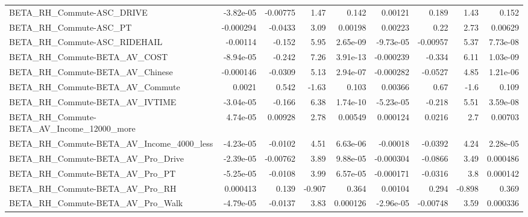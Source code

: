 \begin{tabular}{lrrrrrrrr}
BETA\_RH\_Commute-ASC\_DRIVE                          &   -3.82e-05 &     -0.00775 &      1.47 &    0.142 &    0.00121 &       0.189 &         1.43 &         0.152 \\
BETA\_RH\_Commute-ASC\_PT                             &   -0.000294 &      -0.0433 &      3.09 &  0.00198 &    0.00223 &        0.22 &         2.73 &       0.00629 \\
BETA\_RH\_Commute-ASC\_RIDEHAIL                       &    -0.00114 &       -0.152 &      5.95 & 2.65e-09 &  -9.73e-05 &    -0.00957 &         5.37 &      7.73e-08 \\
BETA\_RH\_Commute-BETA\_AV\_COST                       &   -8.94e-05 &       -0.242 &      7.26 & 3.91e-13 &  -0.000239 &      -0.334 &         6.11 &      1.03e-09 \\
BETA\_RH\_Commute-BETA\_AV\_Chinese                    &   -0.000146 &      -0.0309 &      5.13 & 2.94e-07 &  -0.000282 &     -0.0527 &         4.85 &      1.21e-06 \\
BETA\_RH\_Commute-BETA\_AV\_Commute                    &      0.0021 &        0.542 &     -1.63 &    0.103 &    0.00366 &        0.67 &         -1.6 &         0.109 \\
BETA\_RH\_Commute-BETA\_AV\_IVTIME                     &   -3.04e-05 &       -0.166 &      6.38 & 1.74e-10 &  -5.23e-05 &      -0.218 &         5.51 &      3.59e-08 \\
BETA\_RH\_Commute-BETA\_AV\_Income\_12000\_more          &    4.74e-05 &      0.00928 &      2.78 &  0.00549 &   0.000124 &      0.0216 &          2.7 &       0.00703 \\
BETA\_RH\_Commute-BETA\_AV\_Income\_4000\_less           &   -4.23e-05 &      -0.0102 &      4.51 & 6.63e-06 &   -0.00018 &     -0.0392 &         4.24 &      2.28e-05 \\
BETA\_RH\_Commute-BETA\_AV\_Pro\_Drive                  &   -2.39e-05 &     -0.00762 &      3.89 & 9.88e-05 &  -0.000304 &     -0.0866 &         3.49 &      0.000486 \\
BETA\_RH\_Commute-BETA\_AV\_Pro\_PT                     &   -5.25e-05 &      -0.0108 &      3.99 & 6.57e-05 &  -0.000171 &     -0.0316 &          3.8 &      0.000142 \\
BETA\_RH\_Commute-BETA\_AV\_Pro\_RH                     &    0.000413 &        0.139 &    -0.907 &    0.364 &    0.00104 &       0.294 &       -0.898 &         0.369 \\
BETA\_RH\_Commute-BETA\_AV\_Pro\_Walk                   &   -4.79e-05 &      -0.0137 &      3.83 & 0.000126 &  -2.96e-05 &    -0.00748 &         3.59 &      0.000336 \\

\end{tabular}
